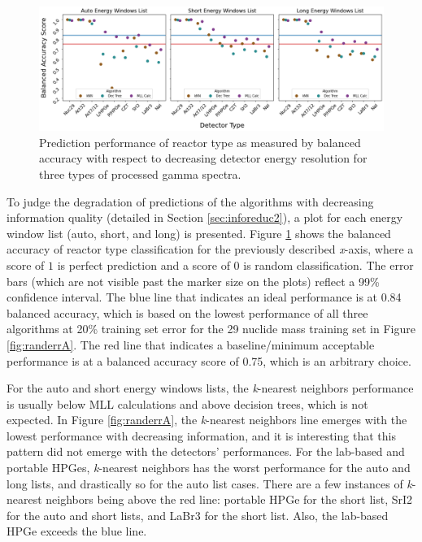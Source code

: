 
\begin{figure}[!htb]
  \centering
  \includegraphics[width=\textwidth]{./chapters/exp2/detector_preds_wrt_enlist_BalAcc_rxtr.png}
  \caption{Prediction performance of reactor type as measured by balanced 
           accuracy with respect to decreasing detector energy resolution 
           for three types of processed gamma spectra.}
  \label{fig:rxtr}
\end{figure}

To judge the degradation of predictions of the algorithms with decreasing
information quality (detailed in Section \ref{sec:inforeduc2}), a plot for each
energy window list (auto, short, and long) is presented.  Figure \ref{fig:rxtr}
shows the balanced accuracy of reactor type classification for the previously
described \textit{x}-axis, where a score of $1$ is perfect prediction and a
score of $0$ is random classification. The error bars (which are not visible
past the marker size on the plots) reflect a 99\% confidence interval.  The
blue line that indicates an ideal performance is at 0.84 balanced accuracy,
which is based on the lowest performance of all three algorithms at 20\%
training set error for the 29 nuclide mass training set in Figure
\ref{fig:randerrA}.  The red line that indicates a baseline/minimum acceptable
performance is at a balanced accuracy score of 0.75, which is an arbitrary
choice. 

For the auto and short energy windows lists, the \textit{k}-nearest neighbors
performance is usually below \gls{MLL} calculations and above decision trees,
which is not expected. In Figure \ref{fig:randerrA}, the \textit{k}-nearest
neighbors line emerges with the lowest performance with decreasing information,
and it is interesting that this pattern did not emerge with the detectors'
performances. For the lab-based and portable \gls{HPGe}s, \textit{k}-nearest
neighbors has the worst performance for the auto and long lists, and
drastically so for the auto list cases. There are a few instances of
\textit{k}-nearest neighbors being above the red line: portable \gls{HPGe} for
the short list, \gls{SrI2} for the auto and short lists, and \gls{LaBr3} for
the short list. Also, the lab-based \gls{HPGe} exceeds the blue line.

